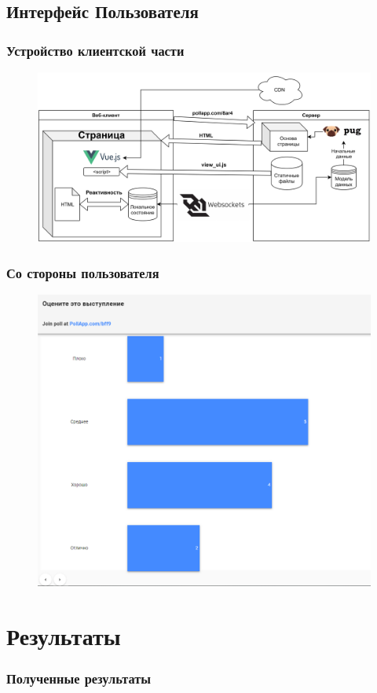 \documentclass{beamer}
\begin{document}
\subsection{Интерфейс Пользователя}
\begin{frame}
\frametitle{Устройство клиентской части}
\begin{figure}
	\includegraphics[width=\linewidth]{img/ui.png}
\end{figure}
\end{frame}

\begin{frame}
\frametitle{Со стороны пользователя}
\begin{figure}
	\includegraphics[width=0.7\linewidth]{img/view.PNG}
\end{figure}
\end{frame}

\section{Результаты}
\begin{frame}
\frametitle{Полученные результаты}

\end{frame}
\end{document}
